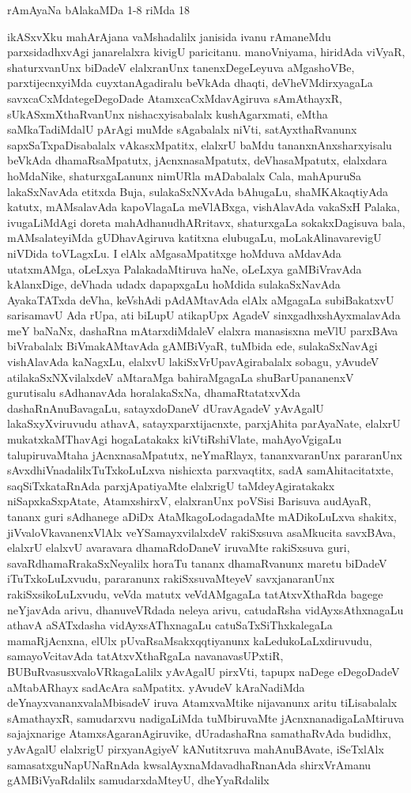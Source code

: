 \hfill rAmAyaNa bAlakaMDa 1-8 riMda 18

ikASxvXku mahArAjana vaMshadalilx janisida ivanu rAmaneMdu parxsidadhxvAgi janarelalxra kivigU paricitanu. manoVniyama, hiridAda viVyaR, shaturxvanUnx biDadeV elalxranUnx tanenxDegeLeyuva aMgashoVBe, parxtijecnxyiMda cuyxtanAgadiralu beVkAda dhaqti, deVheVMdirxyagaLa savxcaCxMdategeDegoDade AtamxcaCxMdavAgiruva sAmAthayxR, sUkASxmXthaRvanUnx nishacxyisabalalx kushAgarxmati, eMtha saMkaTadiMdalU pArAgi muMde sAgabalalx niVti, satAyxthaRvanunx sapxSaTxpaDisabalalx vAkasxMpatitx, elalxrU baMdu tananxnAnxsharxyisalu beVkAda dhamaRsaMpatutx, jAcnxnasaMpatutx, deVhasaMpatutx, elalxdara hoMdaNike, shaturxgaLanunx nimURla mADabalalx Cala, mahApuruSa lakaSxNavAda etitxda Buja, sulakaSxNXvAda bAhugaLu, shaMKAkaqtiyAda katutx, mAMsalavAda kapoVlagaLa meVlABxga, vishAlavAda vakaSxH Palaka, ivugaLiMdAgi doreta mahAdhanudhARritavx, shaturxgaLa sokakxDagisuva bala, mAMsalateyiMda gUDhavAgiruva katitxna elubugaLu, moLakAlinavarevigU niVDida toVLagxLu. I elAlx aMgasaMpatitxge hoMduva aMdavAda utatxmAMga, oLeLxya PalakadaMtiruva haNe, oLeLxya gaMBiVravAda kAlanxDige, deVhada udadx dapapxgaLu hoMdida sulakaSxNavAda AyakaTATxda deVha, keVshAdi pAdAMtavAda elAlx aMgagaLa subiBakatxvU sarisamavU Ada rUpa, ati biLupU atikapUpx AgadeV sinxgadhxshAyxmalavAda meY baNaNx, dashaRna mAtarxdiMdaleV elalxra manasisxna meVlU parxBAva biVrabalalx BiVmakAMtavAda gAMBiVyaR, tuMbida ede, sulakaSxNavAgi vishAlavAda kaNagxLu, elalxvU lakiSxVrUpavAgirabalalx sobagu, yAvudeV atilakaSxNXvilalxdeV aMtaraMga bahiraMgagaLa shuBarUpananenxV gurutisalu sAdhanavAda horalakaSxNa, dhamaRtatatxvXda dashaRnAnuBavagaLu, satayxdoDaneV dUravAgadeV yAvAgalU lakaSxyXviruvudu athavA, satayxparxtijacnxte, parxjAhita parAyaNate, elalxrU mukatxkaMThavAgi hogaLatakakx kiVtiRshiVlate, mahAyoVgigaLu talupiruvaMtaha jAcnxnasaMpatutx, neYmaRlayx, tananxvaranUnx pararanUnx sAvxdhiVnadalilxTuTxkoLuLxva nishicxta parxvaqtitx, sadA samAhitacitatxte, saqSiTxkataRnAda parxjApatiyaMte elalxrigU taMdeyAgiratakakx niSapxkaSxpAtate, AtamxshirxV, elalxranUnx poVSisi Barisuva audAyaR, tananx guri sAdhanege aDiDx AtaMkagoLodagadaMte mADikoLuLxva shakitx, jiVvaloVkavanenxVlAlx veYSamayxvilalxdeV rakiSxsuva asaMkucita savxBAva, elalxrU elalxvU avaravara dhamaRdoDaneV iruvaMte rakiSxsuva guri, savaRdhamaRrakaSxNeyalilx horaTu tananx dhamaRvanunx maretu biDadeV iTuTxkoLuLxvudu, pararanunx rakiSxsuvaMteyeV savxjanaranUnx rakiSxsikoLuLxvudu, veVda matutx veVdAMgagaLa  tatAtxvXthaRda bagege neYjavAda arivu, dhanuveVRdada neleya arivu, catudaRsha vidAyxsAthxnagaLu athavA aSATxdasha vidAyxsAThxnagaLu catuSaTxSiThxkalegaLa  mamaRjAcnxna, elUlx pUvaRsaMsakxqqtiyanunx kaLedukoLaLxdiruvudu, samayoVcitavAda tatAtxvXthaRgaLa navanavasUPxtiR, BUBuRvasusxvaloVRkagaLalilx yAvAgalU pirxVti, tapupx naDege eDegoDadeV aMtabARhayx sadAcAra saMpatitx. yAvudeV kAraNadiMda deYnayxvananxvalaMbisadeV iruva AtamxvaMtike nijavanunx aritu tiLisabalalx sAmathayxR, samudarxvu nadigaLiMda tuMbiruvaMte jAcnxnanadigaLaMtiruva sajajxnarige AtamxsAgaranAgiruvike, dUradashaRna samathaRvAda budidhx, yAvAgalU elalxrigU pirxyanAgiyeV kANutitxruva mahAnuBAvate, iSeTxlAlx samasatxguNapUNaRnAda kwsalAyxnaMdavadhaRnanAda shirxVrAmanu gAMBiVyaRdalilx samudarxdaMteyU, dheYyaRdalilx 